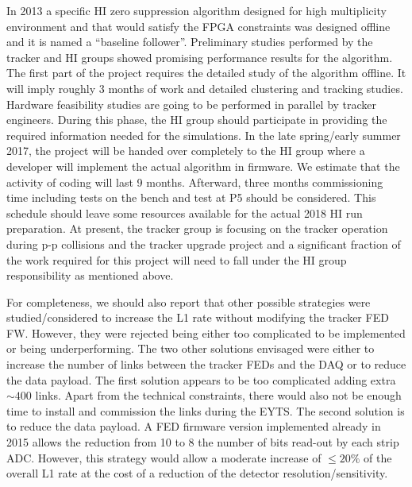 In 2013 a specific HI zero suppression algorithm designed for high multiplicity environment and that would satisfy the FPGA constraints was designed offline and it is named a ``baseline follower''.  Preliminary studies performed by the tracker and HI groups showed promising performance results for the algorithm. The first part of the project requires the detailed study of the algorithm offline. It will imply roughly 3 months of work and detailed clustering and tracking studies. Hardware feasibility studies are going to be performed in parallel by tracker engineers. During this phase, the HI group should participate in providing the required information needed for the simulations. In the late spring/early summer 2017, the project will be handed over completely to the HI group where a developer will implement the actual algorithm in firmware. We estimate that the activity of coding will last 9 months. Afterward, three months commissioning time including tests on the bench and test at P5 should be considered. This schedule should leave some resources available for the actual 2018 HI run preparation. At present, the tracker group is focusing on the tracker operation during p-p collisions and the tracker upgrade project and a significant fraction of the work required for this project will need to fall under the HI group responsibility as mentioned above. 


For completeness, we should also report that other possible strategies were studied/considered to increase the L1 rate without modifying the tracker FED FW. However, they were rejected being either too complicated to be implemented or being underperforming. The two other solutions envisaged were either to increase the number of links between the tracker FEDs and the DAQ or to reduce the data payload. The first solution appears to be too complicated adding extra $\sim 400$ links. Apart from the technical constraints, there would also not be enough time to install and commission the links during the EYTS. The second solution is to reduce the data payload. A FED firmware version implemented already in 2015 allows the reduction from 10 to 8 the number of bits read-out by each strip ADC. However, this strategy would allow a moderate increase of $\le 20 \%$ of the overall L1 rate at the cost of a reduction of the detector resolution/sensitivity. 
